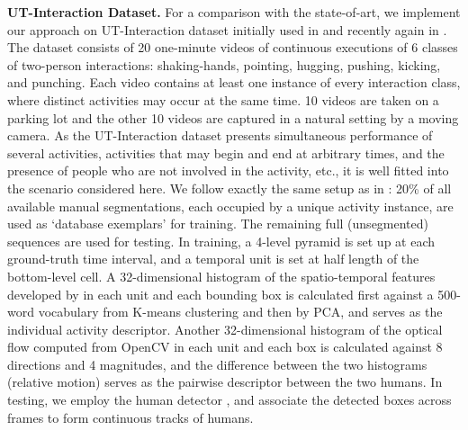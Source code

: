 \noindent\textbf{UT-Interaction Dataset.} For a comparison with the state-of-art, we implement our approach on UT-Interaction dataset initially used in \cite{Ryoo:group} and recently again in \cite{Amer:group}. The dataset consists of 20 one-minute videos of continuous executions of 6 classes of two-person interactions: shaking-hands, pointing, hugging, pushing, kicking, and punching. Each video contains at least one instance of every interaction class, where distinct activities may occur at the same time. 10 videos are taken on a parking lot and the other 10 videos are captured in a natural setting by a moving camera. As the UT-Interaction dataset presents simultaneous performance of several activities, activities that may begin and end at arbitrary times, and the presence of people who are not involved in the activity, etc., it is well fitted into the scenario considered here. We follow exactly the same setup as in \cite{Ryoo:group,Amer:group}: 20\% of all available manual segmentations, each occupied by a unique activity instance, are used as `database exemplars' for training. The remaining full (unsegmented) sequences are used for testing. In training, a 4-level pyramid is set up at each ground-truth time interval, and a temporal unit is set at half length of the bottom-level cell. A 32-dimensional histogram of the spatio-temporal features developed by \cite{Dollar:STIP} in each unit and each bounding box is calculated first against a 500-word vocabulary from K-means clustering and then by PCA, and serves as the individual activity descriptor. Another 32-dimensional histogram of the optical flow computed from OpenCV in each unit and each box is calculated against 8 directions and 4 magnitudes, and the difference between the two histograms (relative motion) serves as the pairwise descriptor between the two humans. In testing, we employ the human detector \cite{Pedro:detect}, and associate the detected boxes across frames to form continuous tracks of humans. 

